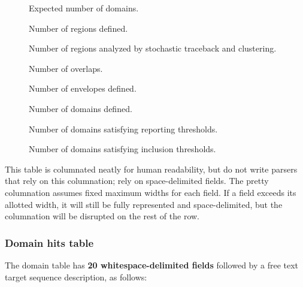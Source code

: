 \begin{description}
\begin{description}
\item[] 

\item[] 

\item[] 

\item[] Expected number of domains.

\item[] Number of regions defined.

\item[]  
  Number of regions analyzed by stochastic traceback and clustering.

\item[] 
  Number of overlaps.

\item[] 
  Number of envelopes defined.

\item[] 
  Number of domains defined.

\item[] 
  Number of domains satisfying reporting thresholds.

\item[] 
  Number of domains satisfying inclusion thresholds.

\item[] 
\end{description}

This table is columnated neatly for human readability, but do not
write parsers that rely on this columnation; rely on space-delimited
fields. The pretty columnation assumes fixed maximum widths for each
field. If a field exceeds its allotted width, it will still be fully
represented and space-delimited, but the columnation will be disrupted
on the rest of the row.









\subsubsection{Domain hits table}

The domain table has \textbf{20 whitespace-delimited fields} followed
by a free text target sequence description, as follows:


\end{description}
